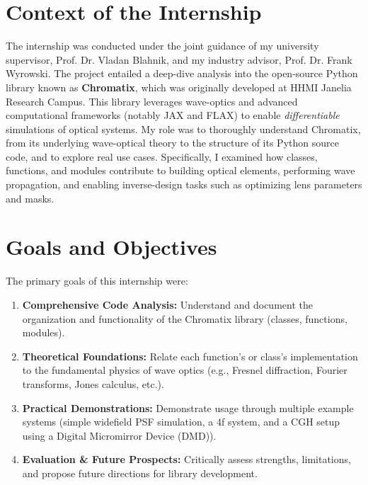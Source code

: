 \documentclass[a4paper,12pt]{report}
\begin{document}
\section{Context of the Internship}
The internship was conducted under the joint guidance of my university supervisor, Prof. Dr. Vladan Blahnik, and my industry advisor, Prof. Dr. Frank Wyrowski. The project entailed a deep-dive analysis into the open-source Python library known as \textbf{Chromatix}, which was originally developed at HHMI Janelia Research Campus. This library leverages wave-optics and advanced computational frameworks (notably JAX and FLAX) to enable \textit{differentiable} simulations of optical systems.\newline
\newline
My role was to thoroughly understand Chromatix, from its underlying wave-optical theory to the structure of its Python source code, and to explore real use cases. Specifically, I examined how classes, functions, and modules contribute to building optical elements, performing wave propagation, and enabling inverse-design tasks such as optimizing lens parameters and masks.

\section{Goals and Objectives}
The primary goals of this internship were:
\begin{enumerate}
    \item \textbf{Comprehensive Code Analysis:} Understand and document the organization and functionality of the Chromatix library (classes, functions, modules).
    \item \textbf{Theoretical Foundations:} Relate each function's or class's implementation to the fundamental physics of wave optics (e.g., Fresnel diffraction, Fourier transforms, Jones calculus, etc.).
    \item \textbf{Practical Demonstrations:} Demonstrate usage through multiple example systems (simple widefield PSF simulation, a 4f system, and a CGH setup using a Digital Micromirror Device (DMD)).
    \item \textbf{Evaluation \& Future Prospects:} Critically assess strengths, limitations, and propose future directions for library development.
\end{enumerate}
\end{document}
